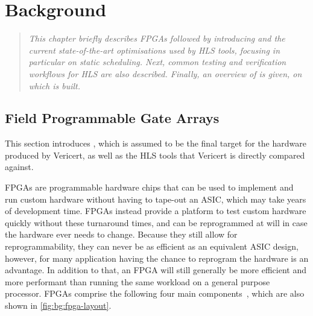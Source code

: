 \chapter{Background}%
\label{sec:background}

\begin{quote}\itshape
  This chapter briefly describes \glspl{FPGA} followed by introducing
   and the current state-of-the-art optimisations used by
  \gls{HLS} tools, focusing in particular on static scheduling.  Next, common
  testing and verification workflows for \gls{HLS} are also described.  Finally,
  an overview of \compcert{} is given, on which \vericert{} is built.
\end{quote}

\section{Field Programmable Gate Arrays}%
\label{sec:bg:fpga}

This section introduces , which is assumed to be the final
target for the hardware produced by Vericert, as well as the \gls{HLS} tools
that Vericert is directly compared against.

\Glspl{FPGA} are programmable hardware chips that can be used to implement and
run custom hardware without having to tape-out an \gls{ASIC}, which may take
years of development time.  \Glspl{FPGA} instead provide a platform to test
custom hardware quickly without these turnaround times, and can be reprogrammed
at will in case the hardware ever needs to change.  Because they still allow for
reprogrammability, they can never be as efficient as an equivalent \gls{ASIC}
design, however, for many application having the chance to reprogram the
hardware is an advantage.  In addition to that, an \gls{FPGA} will still
generally be more efficient and more performant than running the same workload
on a general purpose processor.  \Glspl{FPGA} comprise the following four main
components~\cite{boutros21_fpga_archit}, which are also shown in
\cref{fig:bg:fpga-layout}.

